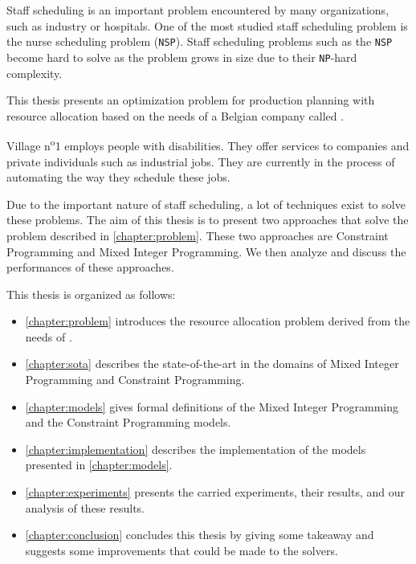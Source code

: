 \documentclass[../thesis.tex]{subfiles}
\begin{document}
Staff scheduling is an important problem encountered by many organizations, such as industry or hospitals.
One of the most studied staff scheduling problem is the nurse scheduling problem (\texttt{NSP}). 
Staff scheduling problems such as the \texttt{NSP} become hard to solve as the problem grows in size due to their \texttt{NP}-hard complexity.

This thesis presents an optimization problem for production planning with resource allocation based on the needs of a Belgian company called \vone.

Village n\textsuperscript{o}1 employs people with disabilities.
They offer services to companies and private individuals such as industrial jobs. They
are currently in the process of automating the way they schedule these jobs. 

Due to the important nature of staff scheduling, a lot of techniques exist to solve these problems. 
The aim of this thesis is to present two approaches that solve the problem described 
in \autoref{chapter:problem}. These two approaches are Constraint Programming and Mixed Integer Programming.
We then analyze and discuss the performances of these approaches.



This thesis is organized as follows:

\begin{itemize}
  \item[] \autoref{chapter:problem} introduces the resource allocation problem derived from the needs of \vone.
  \item[] \autoref{chapter:sota} describes the state-of-the-art in the domains of Mixed Integer Programming and Constraint Programming. 
  \item[] \autoref{chapter:models} gives formal definitions of the Mixed Integer Programming and the Constraint Programming models.
  \item[] \autoref{chapter:implementation} describes the implementation of the models presented in \autoref{chapter:models}.
  \item[] \autoref{chapter:experiments} presents the carried experiments, their results, and our analysis of these results.
  \item[] \autoref{chapter:conclusion} concludes this thesis by giving some takeaway and suggests some improvements that could be made to the solvers.
\end{itemize}
\end{document}
